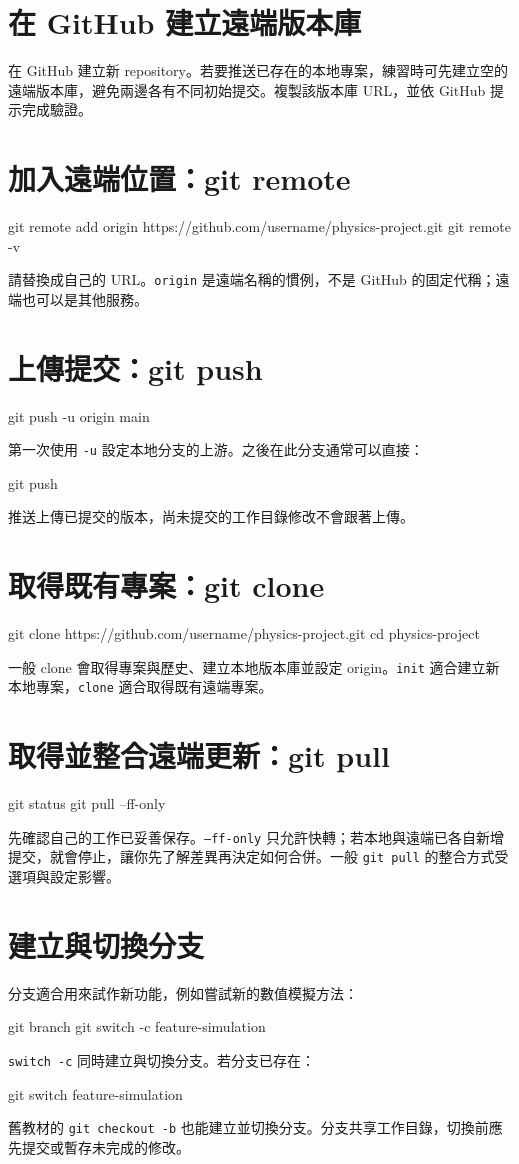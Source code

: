 \documentclass[UTF8,fontset=fandol,11pt,a4paper]{ctexart}
\begin{document}
\section{在 GitHub 建立遠端版本庫}
在 GitHub 建立新 repository。若要推送已存在的本地專案，練習時可先建立空的遠端版本庫，避免兩邊各有不同初始提交。複製該版本庫 URL，並依 GitHub 提示完成驗證。
\section{加入遠端位置：git remote}
\begin{code}
    git remote add origin https://github.com/username/physics-project.git
    git remote -v
\end{code}
請替換成自己的 URL。\texttt{origin} 是遠端名稱的慣例，不是 GitHub 的固定代稱；遠端也可以是其他服務。
\section{上傳提交：git push}
\begin{code}
    git push -u origin main
\end{code}
第一次使用 \texttt{-u} 設定本地分支的上游。之後在此分支通常可以直接：
\begin{code}
    git push
\end{code}
推送上傳已提交的版本，尚未提交的工作目錄修改不會跟著上傳。
\section{取得既有專案：git clone}
\begin{code}
    git clone https://github.com/username/physics-project.git
    cd physics-project
\end{code}
一般 clone 會取得專案與歷史、建立本地版本庫並設定 origin。\texttt{init} 適合建立新本地專案，\texttt{clone} 適合取得既有遠端專案。
\section{取得並整合遠端更新：git pull}
\begin{code}
    git status
    git pull --ff-only
\end{code}
先確認自己的工作已妥善保存。\texttt{--ff-only} 只允許快轉；若本地與遠端已各自新增提交，就會停止，讓你先了解差異再決定如何合併。一般 \texttt{git pull} 的整合方式受選項與設定影響。
\section{建立與切換分支}
分支適合用來試作新功能，例如嘗試新的數值模擬方法：
\begin{code}
    git branch
    git switch -c feature-simulation
\end{code}
\texttt{switch -c} 同時建立與切換分支。若分支已存在：
\begin{code}
    git switch feature-simulation
\end{code}
舊教材的 \texttt{git checkout -b} 也能建立並切換分支。分支共享工作目錄，切換前應先提交或暫存未完成的修改。
\end{document}
